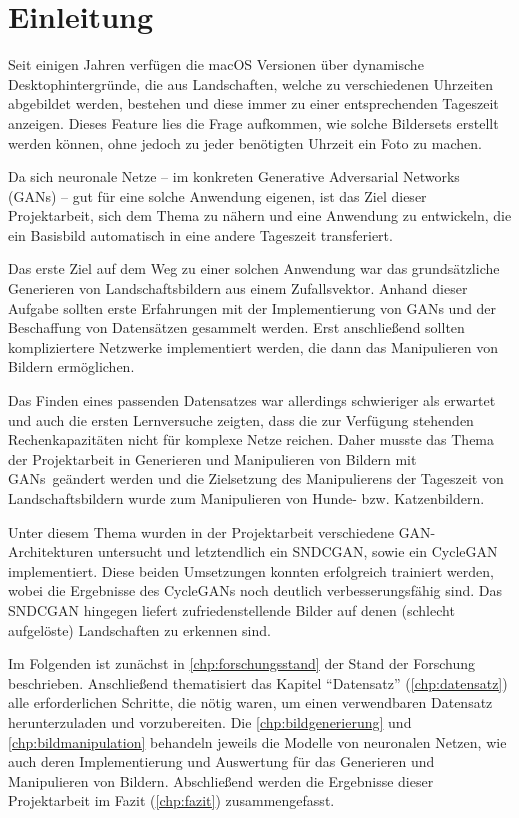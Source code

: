 \chapter{Einleitung}\label{chp:einleitung}%
\glsresetall

Seit einigen Jahren verfügen die macOS Versionen über dynamische Desktophintergründe, die aus 
Landschaften, welche zu verschiedenen Uhrzeiten abgebildet werden, bestehen und diese immer zu 
einer entsprechenden Tageszeit anzeigen. Dieses Feature lies die Frage aufkommen, wie 
solche Bildersets erstellt werden können, ohne jedoch zu jeder benötigten Uhrzeit ein Foto zu 
machen. 

Da sich neuronale Netze -- im konkreten Generative Adversarial Networks (GANs) -- gut für eine 
solche Anwendung eigenen, ist das Ziel dieser Projektarbeit, sich dem Thema zu nähern und eine 
Anwendung zu entwickeln, die ein Basisbild automatisch in eine andere Tageszeit transferiert. 

Das erste Ziel auf dem Weg zu einer solchen Anwendung war das grundsätzliche Generieren von 
Landschaftsbildern aus einem Zufallsvektor. Anhand dieser Aufgabe sollten erste Erfahrungen mit 
der Implementierung von GANs und der Beschaffung von Datensätzen gesammelt werden. Erst 
anschließend sollten kompliziertere Netzwerke implementiert werden, die dann das Manipulieren von 
Bildern ermöglichen.

Das Finden eines passenden Datensatzes war allerdings schwieriger als 
erwartet und auch die ersten Lernversuche zeigten, dass die zur Verfügung stehenden 
Rechenkapazitäten nicht für komplexe Netze reichen. Daher musste das Thema der Projektarbeit in 
\glqq Generieren und Manipulieren von Bildern mit GANs\grqq\ geändert werden und die Zielsetzung 
des Manipulierens der Tageszeit von Landschaftsbildern wurde zum Manipulieren von Hunde- bzw. 
Katzenbildern.

Unter diesem Thema wurden in der Projektarbeit verschiedene GAN-Architekturen untersucht und 
letztendlich ein SNDCGAN, sowie ein CycleGAN implementiert. Diese beiden Umsetzungen konnten 
erfolgreich trainiert werden, wobei die Ergebnisse des CycleGANs noch deutlich 
verbesserungsfähig sind. Das SNDCGAN hingegen liefert zufriedenstellende Bilder auf denen 
(schlecht aufgelöste) Landschaften zu erkennen sind.

Im Folgenden ist zunächst in \autoref{chp:forschungsstand} der Stand der Forschung beschrieben. 
Anschließend thematisiert das Kapitel \enquote{Datensatz} (\autoref{chp:datensatz}) alle 
erforderlichen Schritte, die nötig waren, um einen verwendbaren Datensatz herunterzuladen und 
vorzubereiten. Die \autoref{chp:bildgenerierung} und \ref{chp:bildmanipulation} behandeln 
jeweils die Modelle von neuronalen Netzen, wie auch deren Implementierung und Auswertung für 
das Generieren und Manipulieren von Bildern. Abschließend werden die Ergebnisse dieser 
Projektarbeit im Fazit (\autoref{chp:fazit}) zusammengefasst.